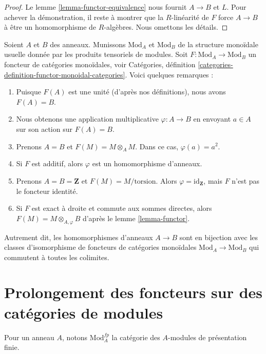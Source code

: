 \begin{proof}
Le lemme \ref{lemma-functor-equivalence} nous fournit $A \to B$ et $L$.
Pour achever la démonstration, il reste à montrer que la $R$-linéarité
de $F$ force $A \to B$ à être un homomorphisme de $R$-algèbres. Nous omettons les détails.
\end{proof}

\begin{remark}
\label{remark-monoidal}
Soient $A$ et $B$ des anneaux. Munissons $\text{Mod}_A$ et $\text{Mod}_B$
de la structure monoïdale usuelle donnée par les produits tensoriels de modules.
Soit $F : \text{Mod}_A \to \text{Mod}_B$ un foncteur de
catégories monoïdales, voir
Catégories, définition \ref{categories-definition-functor-monoidal-categories}.
Voici quelques remarques :
\begin{enumerate}
\item Puisque $F(A)$ est une unité (d'après nos définitions), nous avons $F(A) = B$.
\item Nous obtenons une application multiplicative $\varphi : A \to B$
en envoyant $a \in A$ sur son action sur $F(A) = B$.
\item Prenons $A = B$ et $F(M) = M \otimes_A M$. Dans ce cas, $\varphi(a) = a^2$.
\item Si $F$ est additif, alors $\varphi$ est un homomorphisme d'anneaux.
\item Prenons $A = B = \mathbf{Z}$ et $F(M) = M/\text{torsion}$. Alors
$\varphi = \text{id}_\mathbf{Z}$, mais $F$ n'est pas le foncteur identité.
\item Si $F$ est exact à droite et commute aux sommes directes,
alors $F(M) = M \otimes_{A, \varphi} B$ d'après le lemme \ref{lemma-functor}.
\end{enumerate}
Autrement dit, les homomorphismes d'anneaux $A \to B$ sont en bijection avec les classes d'isomorphisme
de foncteurs de catégories monoïdales $\text{Mod}_A \to \text{Mod}_B$
qui commutent à toutes les colimites.
\end{remark}




\section{Prolongement des foncteurs sur des catégories de modules}
\label{section-functors-extend}

\noindent
Pour un anneau $A$, notons $\text{Mod}^{fp}_A$ la catégorie des
$A$-modules de présentation finie.

